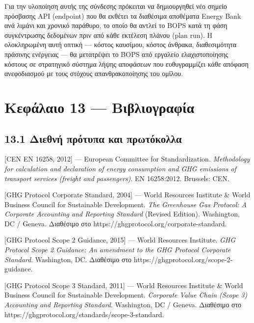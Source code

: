 \documentclass[11pt,a4paper,greek,twoside]{template-xe}
\begin{document}
Για την υλοποίηση αυτής της σύνδεσης πρόκειται να δημιουργηθεί νέο
σημείο πρόσβασης API (endpoint) που θα εκθέτει τα διαθέσιμα αποθέματα
Energy Bank ανά λιμάνι και χρονικό παράθυρο, το οποίο θα αντλεί το BOPS
κατά τη φάση συγκέντρωσης δεδομένων πριν από κάθε εκτέλεση πλάνου (plan
run). Η ολοκληρωμένη αυτή οπτική --- κόστος καυσίμου, κόστος άνθρακα,
διαθεσιμότητα πράσινης ενέργειας --- θα μετατρέψει το BOPS από εργαλείο
ελαχιστοποίησης κόστους σε στρατηγικό σύστημα λήψης αποφάσεων που
ευθυγραμμίζει κάθε απόφαση ανεφοδιασμού με τους στόχους απανθρακοποίησης
του ομίλου.

\pagebreak

\chapter{Κεφάλαιο 13 ---
Βιβλιογραφία}\label{ux3baux3b5ux3c6ux3acux3bbux3b1ux3b9ux3bf-13-ux3b2ux3b9ux3b2ux3bbux3b9ux3bfux3b3ux3c1ux3b1ux3c6ux3afux3b1}

\section{13.1 Διεθνή πρότυπα και
πρωτόκολλα}\label{ux3b4ux3b9ux3b5ux3b8ux3bdux3ae-ux3c0ux3c1ux3ccux3c4ux3c5ux3c0ux3b1-ux3baux3b1ux3b9-ux3c0ux3c1ux3c9ux3c4ux3ccux3baux3bfux3bbux3bbux3b1}

{[}CEN EN 16258, 2012{]} --- European Committee for Standardization.
\emph{Methodology for calculation and declaration of energy consumption
and GHG emissions of transport services (freight and passengers)}. EN
16258:2012. Brussels: CEN.

{[}GHG Protocol Corporate Standard, 2004{]} --- World Resources
Institute \& World Business Council for Sustainable Development.
\emph{The Greenhouse Gas Protocol: A Corporate Accounting and Reporting
Standard} (Revised Edition). Washington, DC / Geneva. Διαθέσιμο στο
https://ghgprotocol.org/corporate-standard.

{[}GHG Protocol Scope 2 Guidance, 2015{]} --- World Resources Institute.
\emph{GHG Protocol Scope 2 Guidance: An amendment to the GHG Protocol
Corporate Standard}. Washington, DC. Διαθέσιμο στο
https://ghgprotocol.org/scope-2-guidance.

{[}GHG Protocol Scope 3 Standard, 2011{]} --- World Resources Institute
\& World Business Council for Sustainable Development. \emph{Corporate
Value Chain (Scope 3) Accounting and Reporting Standard}. Washington, DC
/ Geneva. Διαθέσιμο στο
https://ghgprotocol.org/standards/scope-3-standard.
\end{document}
